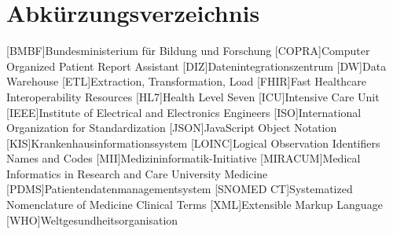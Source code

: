 \chapter*{Abkürzungsverzeichnis}
\setcounter{page}{4}
\begin{acronym}
	
	[BMBF]{Bundesministerium für Bildung und Forschung}
	[COPRA]{Computer Organized Patient Report Assistant}
	[DIZ]{Datenintegrationszentrum}
	[DW]{Data Warehouse}
	[ETL]{Extraction, Transformation, Load}
	[FHIR]{Fast Healthcare Interoperability Resources}
	[HL7]{Health Level Seven}
	[ICU]{Intensive Care Unit}
	[IEEE]{Institute of Electrical and Electronics Engineers}
	[ISO]{International Organization for Standardization}
	[JSON]{JavaScript Object Notation}
	[KIS]{Krankenhausinformationssystem}
	[LOINC]{Logical Observation Identifiers Names and Codes}
	[MII]{Medizininformatik-Initiative}
	[MIRACUM]{Medical Informatics in Research and Care University Medicine}
	[PDMS]{Patientendatenmanagementsystem}
	[SNOMED CT]{Systematized Nomenclature of Medicine Clinical Terms}
	[XML]{Extensible Markup Language}
	[WHO]{Weltgesundheitsorganisation}

\end{acronym}


